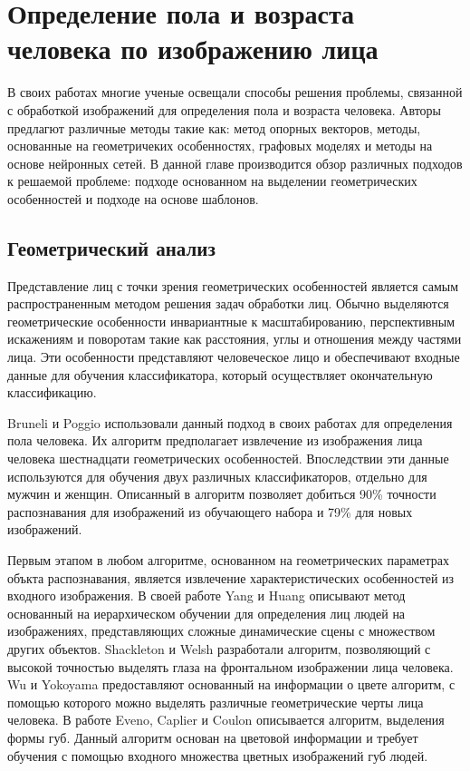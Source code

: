\section{Определение пола и возраста человека по изображению лица}
В своих работах многие ученые освещали способы решения проблемы, связанной с
обработкой изображений для определения пола и возраста человека. Авторы
предлагют различные методы такие как: метод опорных векторов, методы, основанные
на геометричеких особенностях, графовых моделях и методы на основе нейронных
сетей. В данной главе производится обзор различных подходов к решаемой проблеме:
подходе основанном на выделении геометрических особенностей и подходе на основе
шаблонов.


\subsection{Геометрический анализ}
Представление лиц  с точки зрения геометрических особенностей является самым
распространенным методом решения задач обработки лиц. Обычно выделяются
геометрические особенности инвариантные к  масштабированию, перспективным
искажениям и поворотам такие как расстояния, углы и отношения между частями
лица. Эти особенности представляют человеческое лицо и обеспечивают входные
данные для обучения классификатора, который осуществляет окончательную
классификацию.

Bruneli и Poggio \cite{Bruneli_Poggio} использовали данный подход в своих
работах для определения пола человека. Их алгоритм предполагает извлечение из
изображения лица человека шестнадцати геометрических особенностей. Впоследствии
эти данные используются для обучения двух различных классификаторов, отдельно
для мужчин и женщин. Описанный в \cite{Bruneli_Poggio} алгоритм позволяет
добиться 90\% точности распознавания для изображений из обучающего набора и 79\%
для новых изображений.

Первым этапом в любом алгоритме, основанном на геометрических параметрах объкта
распознавания, является извлечение характеристических особенностей из входного
изображения. В своей работе \cite{Yang_Huang} Yang и Huang описывают метод
основанный на иерархическом обучении для определения лиц людей на изображениях,
представляющих сложные динамические сцены с множеством других объектов.
Shackleton и Welsh \cite{Shackleton_Welsh} разработали алгоритм, позволяющий с
высокой точностью выделять глаза на фронтальном изображении лица человека. Wu и
Yokoyama \cite{Wu_Yokoyama} предоставляют основанный на информации о цвете
алгоритм, с помощью которого можно выделять различные геометрические черты лица
человека. В работе Eveno, Caplier и Coulon \cite{Eveno_Caplier_Coulon}
описывается алгоритм, выделения формы губ. Данный алгоритм основан на цветовой
информации и требует обучения с помощью входного множества цветных изображений
губ людей.


